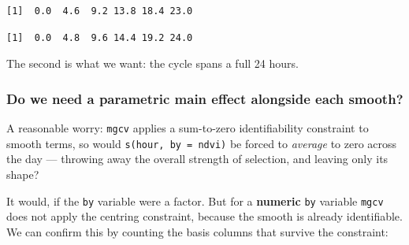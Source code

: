 \documentclass[
  letterpaper,
  DIV=11,
  numbers=noendperiod]{scrartcl}
\newenvironment{Shaded}{\begin{snugshade}}{\end{snugshade}}
\newcommand{\AttributeTok}[1]{\textcolor[rgb]{0.40,0.45,0.13}{#1}}
\newcommand{\CommentTok}[1]{\textcolor[rgb]{0.37,0.37,0.37}{#1}}
\newcommand{\ConstantTok}[1]{\textcolor[rgb]{0.56,0.35,0.01}{#1}}
\newcommand{\DecValTok}[1]{\textcolor[rgb]{0.68,0.00,0.00}{#1}}
\newcommand{\FunctionTok}[1]{\textcolor[rgb]{0.28,0.35,0.67}{#1}}
\newcommand{\NormalTok}[1]{\textcolor[rgb]{0.00,0.23,0.31}{#1}}
\newcommand{\SpecialCharTok}[1]{\textcolor[rgb]{0.37,0.37,0.37}{#1}}
\newcommand{\StringTok}[1]{\textcolor[rgb]{0.13,0.47,0.30}{#1}}
\begin{document}
\begin{verbatim}
[1]  0.0  4.6  9.2 13.8 18.4 23.0
\end{verbatim}

\begin{Shaded}
\end{Shaded}

\begin{verbatim}
[1]  0.0  4.8  9.6 14.4 19.2 24.0
\end{verbatim}

The second is what we want: the cycle spans a full 24 hours.

\subsubsection{Do we need a parametric main effect alongside each
smooth?}\label{do-we-need-a-parametric-main-effect-alongside-each-smooth}

A reasonable worry: \texttt{mgcv} applies a sum-to-zero identifiability
constraint to smooth terms, so would \texttt{s(hour,\ by\ =\ ndvi)} be
forced to \emph{average} to zero across the day --- throwing away the
overall strength of selection, and leaving only its shape?

It would, if the \texttt{by} variable were a factor. But for a
\textbf{numeric} \texttt{by} variable \texttt{mgcv} does not apply the
centring constraint, because the smooth is already identifiable. We can
confirm this by counting the basis columns that survive the constraint:
\end{document}
